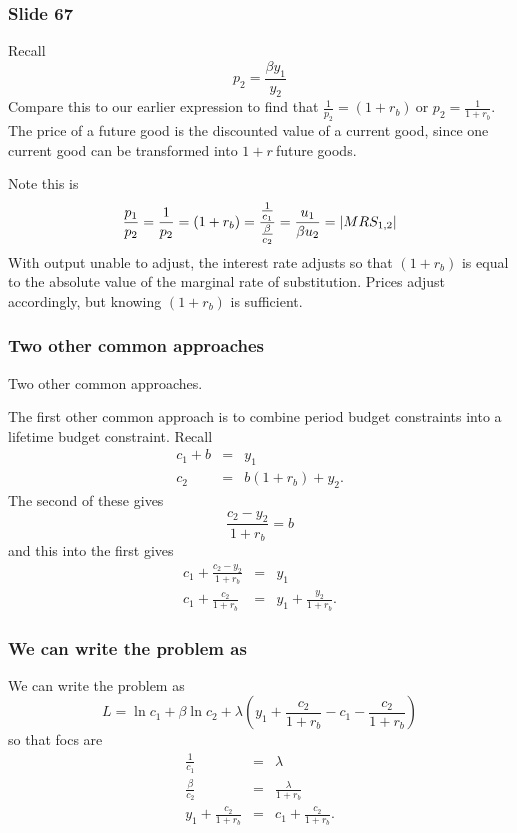\documentclass[aspectratio=169]{ltx-talk}
\begin{document}
\begin{frame}
\frametitle{Slide 67}
Recall%
\begin{equation*}
p_{2}=\frac{\beta y_{1}}{y_{2}}
\end{equation*}%
Compare this to our earlier expression to find that $\frac{1}{p_{2}}=\left(
1+r_{b}\right) \ $or $p_{2}=\frac{1}{1+r_{b}}.$ The price of a future good
is the discounted value of a current good, since one current good can be
transformed into $1+r\ $future goods.

Note this is 
\begin{equation*}
\frac{p_{1}}{p_{2}}=\frac{1}{p_{2}}=\left( 1+r_{b}\right) =\frac{\frac{1}{%
c_{1}}}{\frac{\beta }{c_{2}}}=\frac{u_{1}}{\beta u_{2}}=\left\vert
MRS_{1,2}\right\vert
\end{equation*}%
With output unable to adjust, the interest rate adjusts so that $\left(
1+r_{b}\right) $ is equal to the absolute value of the marginal rate of
substitution. Prices adjust accordingly, but knowing $(1+r_{b})$ is
sufficient.
\end{frame}

\begin{frame}
\frametitle{Two other common approaches}
Two other common approaches.

The first other common approach is to combine period budget constraints into
a lifetime budget constraint. Recall 
\begin{eqnarray*}
c_{1}+b &=&y_{1} \\
c_{2} &=&b\left( 1+r_{b}\right) +y_{2}.
\end{eqnarray*}%
The second of these gives 
\begin{equation*}
\frac{c_{2}-y_{2}}{1+r_{b}}=b
\end{equation*}%
and this into the first gives%
\begin{eqnarray*}
c_{1}+\frac{c_{2}-y_{2}}{1+r_{b}} &=&y_{1} \\
c_{1}+\frac{c_{2}}{1+r_{b}} &=&y_{1}+\frac{y_{2}}{1+r_{b}}.
\end{eqnarray*}%
\end{frame}

\begin{frame}
\frametitle{We can write the problem as}
We can write the problem as 
\begin{equation*}
L=\ln c_{1}+\beta \ln c_{2}+\lambda \left( y_{1}+\frac{c_{2}}{1+r_{b}}-c_{1}-%
\frac{c_{2}}{1+r_{b}}\right)
\end{equation*}%
so that focs are%
\begin{eqnarray*}
\frac{1}{c_{1}} &=&\lambda \\
\frac{\beta }{c_{2}} &=&\frac{\lambda }{1+r_{b}} \\
y_{1}+\frac{c_{2}}{1+r_{b}} &=&c_{1}+\frac{c_{2}}{1+r_{b}}.
\end{eqnarray*}%
\end{frame}
\end{document}
